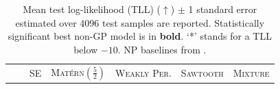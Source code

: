\begin{table}[b]
	\small
	\centering
	\caption{
		Mean test log-likelihood (TLL) (\(\uparrow\)) \(\pm\) 1 standard error estimated over 4096 test samples are reported.
		Statistically significant best non-GP model is in \textbf{bold}.
		`*' stands for a TLL below \(-10\).
		NP baselines from \textcite{bruinsma2020Gaussian}.
	}
	\label{tab:1d_regression}
	\setlength{\tabcolsep}{3.5pt}
	\begin{tabular}{llrrrrr}
		\toprule
		 &                                                         & \multicolumn{1}{c}{\scshape SE}                                               & \multicolumn{1}{c}{\scshape Mat\'ern\((\tfrac52)\)}                             & \multicolumn{1}{c}{\scshape Weakly Per.}                           & \multicolumn{1}{c}{\scshape Sawtooth}                                         & \multicolumn{1}{c}{\scshape Mixture}                                          \\


\end{tabular}
\end{table}

